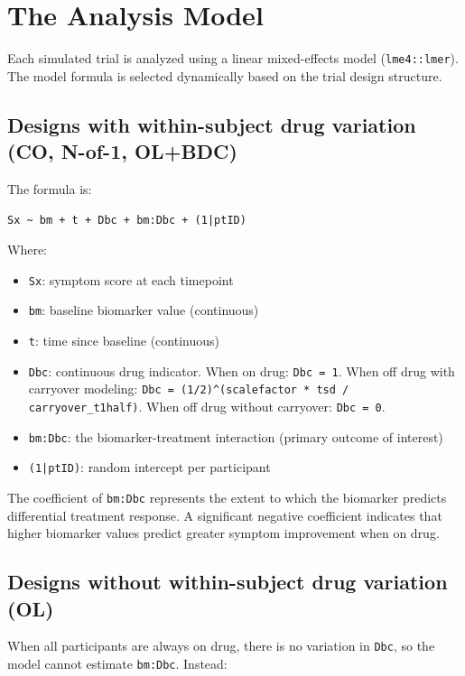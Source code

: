 \documentclass[11pt]{article}
\begin{document}
\section{The Analysis Model}

Each simulated trial is analyzed using a linear mixed-effects
model (\texttt{lme4::lmer}). The model formula is selected dynamically
based on the trial design structure.

\subsection{Designs with within-subject drug variation (CO, N-of-1, OL+BDC)}

The formula is:

\begin{verbatim}
Sx ~ bm + t + Dbc + bm:Dbc + (1|ptID)
\end{verbatim}

Where:

\begin{itemize}
  \item \texttt{Sx}: symptom score at each timepoint
  \item \texttt{bm}: baseline biomarker value (continuous)
  \item \texttt{t}: time since baseline (continuous)
  \item \texttt{Dbc}: continuous drug indicator. When on drug: \texttt{Dbc = 1}.
    When off drug with carryover modeling:
    \texttt{Dbc = (1/2)\^{}(scalefactor * tsd / carryover\_t1half)}.
    When off drug without carryover: \texttt{Dbc = 0}.
  \item \texttt{bm:Dbc}: the biomarker-treatment interaction (primary
    outcome of interest)
  \item \texttt{(1|ptID)}: random intercept per participant
\end{itemize}

The coefficient of \texttt{bm:Dbc} represents the extent to which the
biomarker predicts differential treatment response. A significant
negative coefficient indicates that higher biomarker values
predict greater symptom improvement when on drug.

\subsection{Designs without within-subject drug variation (OL)}

When all participants are always on drug, there is no variation
in \texttt{Dbc}, so the model cannot estimate \texttt{bm:Dbc}. Instead:
\end{document}
